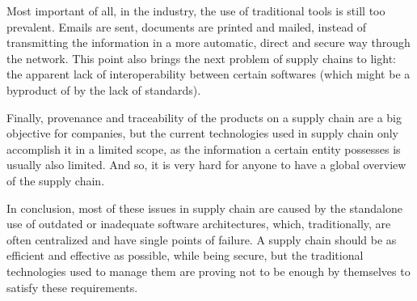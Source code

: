 Most important of all, in the industry, the use of traditional tools is still too prevalent. Emails are sent, documents are printed and mailed, instead of transmitting the information in a more automatic, direct and secure way through the network. This point also brings the next problem of supply chains to light: the apparent lack of interoperability between certain softwares (which might be a byproduct of by the lack of standards).
 
 
Finally, provenance and traceability of the products on a supply chain are a big objective for companies, but the current technologies used in supply chain only accomplish it in a limited scope, as the information a certain entity possesses is usually also limited. And so, it is very hard for anyone to have a global overview of the supply chain.

In conclusion, most of these issues in supply chain are caused by the standalone use of outdated or inadequate software architectures, which, traditionally, are often centralized and have single points of failure. A supply chain should be as efficient and effective as possible, while being secure, but the traditional technologies used to manage them are proving not to be enough by themselves to satisfy these requirements.
